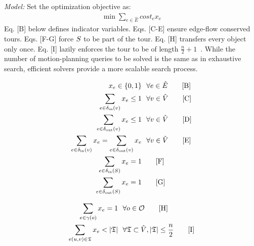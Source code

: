 \textit{Model:} Set the optimization objective as:
\begin{align*}
	\min \sum_{e \in \hat{E}} cost_e x_e \tag*{[A]}
\end{align*}
Eq. [B] below defines indicator variables. Eqs. [C-E] ensure edge-flow conserved tours. Eqs. [F-G] force $S$ to be part of the tour. Eq. [H] transfers every object only once. Eq. [I] lazily enforces the tour to be of length $ \frac{n}{2} + 1 $~\cite{dantzig1954solution}. While the number of motion-planning queries to be solved is the same as in exhaustive search, efficient {\milp} solvers \cite{gurobi} provide a more scalable search process.

\vspace{-.1in}
\noindent\begin{minipage}{.48\textwidth}
\begin{align*}
x_e \in \{ 0,1 \}& \ \ \forall e \in \hat{E} \tag*{[B]}\\
\sum_{e\in\delta_{\rm in}(v)} x_e \leq 1& \ \ \forall v\in \hat{V} \tag*{[C]}\\
\sum_{e\in\delta_{\rm out}(v)} x_e \leq 1& \ \ \forall v\in \hat{V} \tag*{[D]}\\
\sum_{e\in\delta_{\rm in}(v)}x_e = \sum_{e\in\delta_{\rm out}(v)}x_e& \ \ \forall v\in \hat{V} \tag*{[E]}\\
\sum_{e\in\delta_{\rm in}(S)} x_e = 1& \tag*{[F]}\\
\sum_{e\in\delta_{\rm out}(S)} x_e = 1& \tag*{[G]}\\
\end{align*}
\end{minipage}
\noindent\begin{minipage}{.48\textwidth}
\begin{align*}
\sum_{e\in\gamma(\object)} x_e = 1& \ \  \forall \object\in\objectset \tag*{[H]}\\
\sum_{e(u,v)\in \mathfrak{T}} x_e < |\mathfrak{T}| & \ \  \forall \mathfrak{T} \subset \hat{V}, |\mathfrak{T}| \leq \frac{n}{2} \tag*{[I]}
\label{model:milp}
\end{align*}
\end{minipage}

